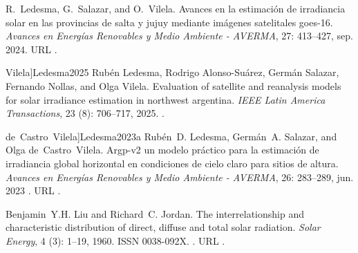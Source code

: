 \documentclass[letterpaper,12pt, twoside]{report}
\providecommand{\DIFdeltex}[1]{{\protect\color{red} \scriptsize #1}} %
\providecommand{\DIFdel}[1]{\texorpdfstring{\DIFdeltex{#1}}{}} %
\begin{document}
\DIFdel{R.~Ledesma, G.~Salazar, and O.~Vilela.
}%
\DIFdel{Avances en la estimación de irradiancia solar en las provincias de
  salta y jujuy mediante imágenes satelitales goes-16.
}%
\DIFdel{\emph{Avances en Energías Renovables y Medio Ambiente - AVERMA},
  27:}%
\DIFdel{413–427, sep. 2024.
}%
\DIFdel{URL
  }%
\DIFdel{.
}%

  Vilela]{Ledesma2025}
\DIFdel{Rubén Ledesma, Rodrigo Alonso-Suárez, Germán Salazar, Fernando Nollas, and
  Olga Vilela.
}%
\DIFdel{Evaluation of satellite and reanalysis models for solar irradiance
  estimation in northwest argentina.
}%
\DIFdel{\emph{IEEE Latin America Transactions}, 23}%
\DIFdel{(8):}%
\DIFdel{706--717, 2025.
}%
\DIFdel{.
}%

  de~Castro~Vilela]{Ledesma2023a}
\DIFdel{Rubén~D. Ledesma, Germán~A. Salazar, and Olga de~Castro~Vilela.
}%
\DIFdel{Argp-v2 un modelo práctico para la estimación de irradiancia global
  horizontal en condiciones de cielo claro para sitios de altura.
}%
\DIFdel{\emph{Avances en Energías Renovables y Medio Ambiente - AVERMA},
  26:}%
\DIFdel{283–289, jun. 2023}%
\DIFdel{.
}%
\DIFdel{URL
  }%
\DIFdel{.
}%

\DIFdel{Benjamin~Y.H. Liu and Richard~C. Jordan.
}%
\DIFdel{The interrelationship and characteristic distribution of direct,
  diffuse and total solar radiation.
}%
\DIFdel{\emph{Solar Energy}, 4}%
\DIFdel{(3):}%
\DIFdel{1--19, 1960.
}%
\DIFdel{ISSN 0038-092X.
}%
\DIFdel{.
}%
\DIFdel{URL
  }%
\DIFdel{.
}%
\end{document}
